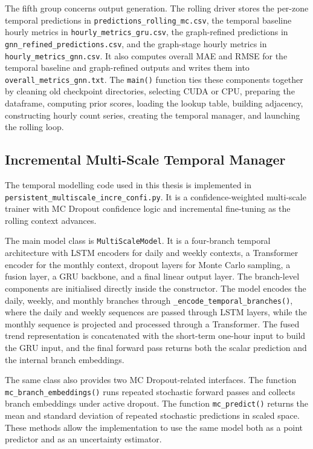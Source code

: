 \documentclass[12pt,a4paper]{report}
\begin{document}
	The fifth group concerns output generation. The rolling driver stores the per-zone temporal predictions in \texttt{predictions\_rolling\_mc.csv}, the temporal baseline hourly metrics in \texttt{hourly\_metrics\_gru.csv}, the graph-refined predictions in \texttt{gnn\_refined\_predictions.csv}, and the graph-stage hourly metrics in \texttt{hourly\_metrics\_gnn.csv}. It also computes overall MAE and RMSE for the temporal baseline and graph-refined outputs and writes them into \texttt{overall\_metrics\_gnn.txt}. The \texttt{main()} function ties these components together by cleaning old checkpoint directories, selecting CUDA or CPU, preparing the dataframe, computing prior scores, loading the lookup table, building adjacency, constructing hourly count series, creating the temporal manager, and launching the rolling loop.
	
\subsection{Incremental Multi-Scale Temporal Manager}
	
	The temporal modelling code used in this thesis is implemented in \texttt{persistent\_multiscale\_incre\_confi.py}. It is a confidence-weighted multi-scale trainer with MC Dropout confidence logic and incremental fine-tuning as the rolling context advances.
	
	The main model class is \texttt{MultiScaleModel}. It is a four-branch temporal architecture with LSTM encoders for daily and weekly contexts, a Transformer encoder for the monthly context, dropout layers for Monte Carlo sampling, a fusion layer, a GRU backbone, and a final linear output layer. The branch-level components are initialised directly inside the constructor. The model encodes the daily, weekly, and monthly branches through \texttt{\_encode\_temporal\_branches()}, where the daily and weekly sequences are passed through LSTM layers, while the monthly sequence is projected and processed through a Transformer. The fused trend representation is concatenated with the short-term one-hour input to build the GRU input, and the final forward pass returns both the scalar prediction and the internal branch embeddings.
	
	The same class also provides two MC Dropout-related interfaces. The function \texttt{mc\_branch\_embeddings()} runs repeated stochastic forward passes and collects branch embeddings under active dropout. The function \texttt{mc\_predict()} returns the mean and standard deviation of repeated stochastic predictions in scaled space. These methods allow the implementation to use the same model both as a point predictor and as an uncertainty estimator.
	
\end{document}
